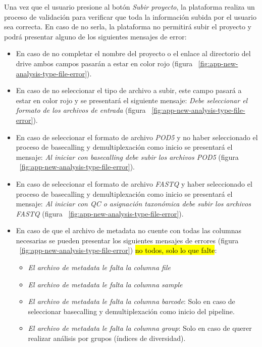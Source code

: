 \begin{itemize}


Una vez que el usuario presione al botón \textit{Subir proyecto}, la plataforma realiza un proceso de validación para verificar que toda la información subida por el usuario sea correcta. En caso de no serla, la plataforma no permitirá subir el proyecto y podrá presentar alguno de los siguientes mensajes de error:
\begin{itemize}
    \item En caso de no completar el nombre del proyecto o el enlace al directorio del drive ambos campos pasarán a estar en color rojo (figura ~\ref{fig:app-new-analysis-type-file-error}).
    \item En caso de no seleccionar el tipo de archivo a subir, este campo pasará a estar en color rojo y se presentará el siguiente mensaje: \textit{Debe seleccionar el formato de los archivos de entrada} (figura ~\ref{fig:app-new-analysis-type-file-error}).
    \item En caso de seleccionar el formato de archivo \textit{POD5} y no haber seleccionado el proceso de basecalling y demultiplexación como inicio se presentará el mensaje: \textit{Al iniciar con basecalling debe subir los archivos POD5} (figura ~\ref{fig:app-new-analysis-type-file-error}).
    \item En caso de seleccionar el formato de archivo \textit{FASTQ} y haber seleccionado el proceso de basecalling y demultiplexación como inicio se presentará el mensaje: \textit{Al iniciar con QC o asignación taxonómica debe subir los archivos FASTQ} (figura ~\ref{fig:app-new-analysis-type-file-error}).
    \item En caso de que el archivo de metadata no cuente con todas las columnas necesarias se pueden presentar los siguientes mensajes de errores (figura ~\ref{fig:app-new-analysis-type-file-error}) \hl{no todos, solo lo que falte}:
    \begin{itemize}
        \item \textit{El archivo de metadata le falta la columna file}
        \item \textit{El archivo de metadata le falta la columna sample}
        \item \textit{El archivo de metadata le falta la columna barcode}: Solo en caso de seleccionar basecalling y demultiplexación como inicio del pipeline.
        \item \textit{El archivo de metadata le falta la columna group}: Solo en caso de querer realizar análisis por grupos (índices de diversidad).


\end{itemize}
\end{itemize}
\end{itemize}
